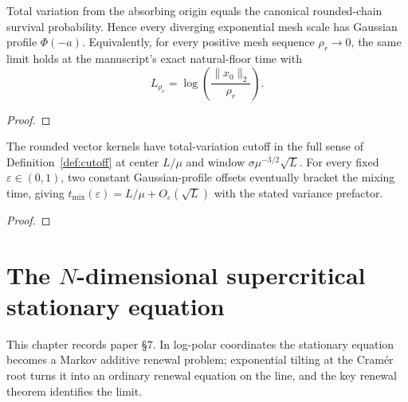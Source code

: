 \begin{theorem}
  \label{thm:fixed-width-tv-profile}
  \leanok
  Total variation from the absorbing origin equals the canonical rounded-chain
  survival probability.  Hence every diverging exponential mesh scale has
  Gaussian profile $\Phi(-a)$.  Equivalently, for every positive mesh sequence
  $\rho_r\to0$, the same limit holds at the manuscript's exact natural-floor
  time with
  \[
    L_{\rho_r}=\log\!\left(\frac{\lVert x_0\rVert_2}{\rho_r}\right).
  \]
\end{theorem}
\begin{proof}
  \leanok
\end{proof}

\begin{theorem}
  \label{thm:fixed-width-cutoff}
  \leanok
  The rounded vector kernels have total-variation cutoff in the full sense of
  Definition~\ref{def:cutoff} at center $L/\mu$ and
  window $\sigma\mu^{-3/2}\sqrt L$.  For every fixed
  $\varepsilon\in(0,1)$, two constant Gaussian-profile offsets eventually
  bracket the mixing time, giving
  $t_{\mathrm{mix}}(\varepsilon)=L/\mu+O_\varepsilon(\sqrt L)$ with the stated
  variance prefactor.
\end{theorem}
\begin{proof}
  \leanok
\end{proof}

\chapter{The \texorpdfstring{$N$}{N}-dimensional supercritical stationary equation}

This chapter records paper §7.  In log-polar coordinates the stationary equation
becomes a Markov additive renewal problem; exponential tilting at the Cram\'er
root turns it into an ordinary renewal equation on the line, and the key renewal
theorem identifies the limit.


